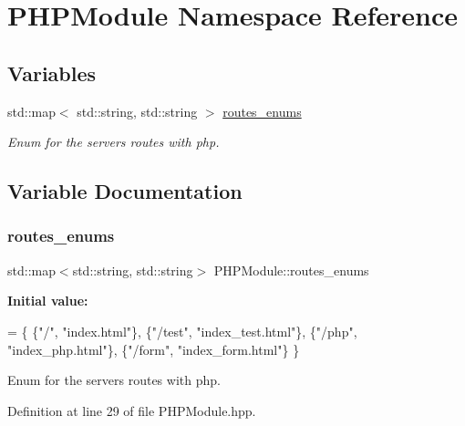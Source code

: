 \hypertarget{namespace_p_h_p_module}{}\section{P\+H\+P\+Module Namespace Reference}
\label{namespace_p_h_p_module}
\subsection*{Variables}
\begin{DoxyCompactItemize}
\item 
std\+::map$<$ std\+::string, std\+::string $>$ \hyperlink{namespace_p_h_p_module_a8b51dfcb9114f032151ac407675938b1}{routes\+\_\+enums}
\begin{DoxyCompactList}\small\item\em Enum for the server\textquotesingle{}s routes with php. \end{DoxyCompactList}\end{DoxyCompactItemize}


\subsection{Variable Documentation}
\mbox{\label{namespace_p_h_p_module_a8b51dfcb9114f032151ac407675938b1}} 
\subsubsection{\texorpdfstring{routes\+\_\+enums}{routes\_enums}}
{\footnotesize\ttfamily std\+::map$<$std\+::string, std\+::string$>$ P\+H\+P\+Module\+::routes\+\_\+enums}

{\bfseries Initial value\+:}
\begin{DoxyCode}
= \{
        \{\textcolor{stringliteral}{"/"},      \textcolor{stringliteral}{"index.html"}\},
        \{\textcolor{stringliteral}{"/test"},  \textcolor{stringliteral}{"index\_test.html"}\},
        \{\textcolor{stringliteral}{"/php"},   \textcolor{stringliteral}{"index\_php.html"}\},
        \{\textcolor{stringliteral}{"/form"},  \textcolor{stringliteral}{"index\_form.html"}\}
    \}
\end{DoxyCode}


Enum for the server\textquotesingle{}s routes with php. 



Definition at line 29 of file P\+H\+P\+Module.\+hpp.

